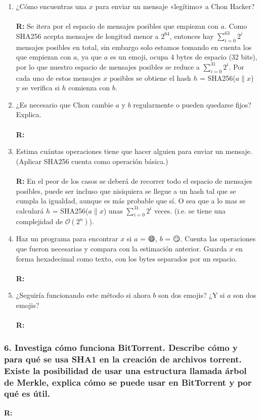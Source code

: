 \documentclass[14pt]{article}
\begin{document}
\begin{enumerate}[label=\alph*)]
\item ¿Cómo encuentras una $x$ para enviar un mensaje «legítimo» a Chon Hacker? \\ \\
\textbf{R:} Se itera por el espacio de mensajes posibles que empiezan con $a$. Como SHA256 acepta mensajes de longitud menor a $2^{64}$, entonces hay $\sum_{i = 0}^{63} 2^i$ mensajes posibles en total, sin embargo solo estamos tomando en cuenta los que empiezan con $a$, ya que $a$ es un emoji, ocupa 4 bytes de espacio (32 bits), por lo que nuestro espacio de mensajes posibles se reduce a $\sum_{i = 0}^{31} 2^i$. Por cada uno de estos mensajes $x$ posibles se obtiene el hash $h$ = SHA256($a \parallel x$)  y se verifica si $h$ comienza con $b$.

\item ¿Es necesario que Chon cambie $a$ y $b$ regularmente o pueden quedarse fijos? Explica. \\ \\
  \textbf{R:} 
  
\item Estima cuántas operaciones tiene que hacer alguien para enviar un mensaje. (Aplicar SHA256 cuenta como operación básica.) \\ \\
  \textbf{R:} En el peor de los casos se deberá de recorrer todo el espacio de mensajes posibles, puede ser incluso que nisiquiera se llegue a un hash tal que se cumpla la igualdad, aunque es más probable que sí. O sea que a lo mas se calculará $h$ = SHA256($a \parallel x$) unas  $\sum_{i = 0}^{31} 2^i$ veces. (i.e. se tiene una complejidad de $\mathcal{O} (2^n)$).
  
\item Haz un programa para encontrar $x$ si $a$ = 😄, $b$ = 😏. Cuenta las operaciones que fueron necesarias y compara con la estimación anterior. Guarda $x$ en forma hexadecimal como texto, con los bytes separados por un espacio. \\ \\
  \textbf{R:}
  
\item ¿Seguiría funcionando este método si ahora $b$ son dos emojis? ¿Y si $a$ son dos emojis? \\ \\
  \textbf{R:}
\end{enumerate}

\subsubsection*{6. Investiga cómo funciona BitTorrent. Describe cómo y para qué se usa SHA1 en la creación de archivos torrent. Existe la posibilidad de usar una estructura llamada árbol de Merkle, explica cómo se puede usar en BitTorrent y por qué es útil.}
\textbf{R:} 
\end{document}
